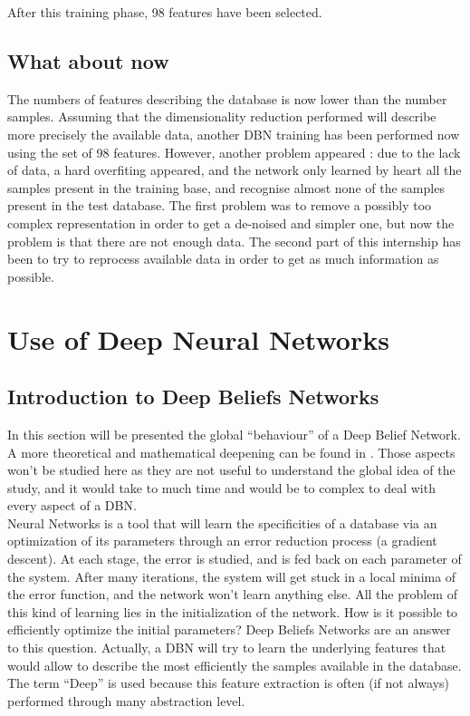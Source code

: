 \documentclass{report}
\begin{document}
			After this training phase, 98 features have been selected.
		
		\section{What about now}
		
			The numbers of features describing the database is now lower than the number samples. Assuming that the dimensionality reduction performed will describe more precisely the available data, another DBN training has been performed now using the set of 98 features. However, another problem appeared : due to the lack of data, a hard overfiting appeared, and the network only learned by heart all the samples present in the training base, and recognise almost none of the samples present in the test database. The first problem was to remove a possibly too complex representation in order to get a de-noised and simpler one, but now the problem is that there are not enough data. The second part of this internship has been to try to reprocess available data in order to get as much information as possible.
		
	\chapter{Use of Deep Neural Networks}
		
		\section{Introduction to Deep Beliefs Networks}
		
		In this section will be presented the global “behaviour” of a Deep Belief Network. A more theoretical and mathematical deepening can be found in \cite{hinton2006fast}. Those aspects won't be studied here as they are not useful to understand the global idea of the study, and it would take to much time and would be to complex to deal with every aspect of a DBN.\\
		
		Neural Networks is a tool that will learn the specificities of a database via an optimization of its parameters through an error reduction process (a gradient descent). At each stage, the error is studied, and is fed back on each parameter of the system. After many iterations, the system will get stuck in a local minima of the error function, and the network won't learn anything else. All the problem of this kind of learning lies in the initialization of the network. How is it possible to efficiently optimize the initial parameters? Deep Beliefs Networks are an answer to this question. Actually, a DBN will try to learn the underlying features that would allow to describe the most efficiently the samples available in the database. The term “Deep” is used because this feature extraction is often (if not always) performed through many abstraction level.\\
		
\end{document}
